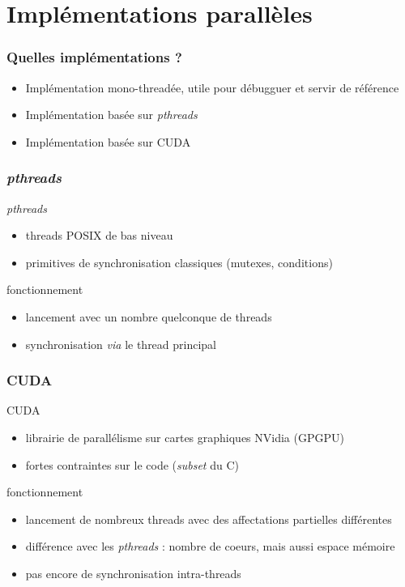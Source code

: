 \documentclass{beamer}
\newcommand{\cuda}{\textsc{CUDA}}
\begin{document}

\section{Implémentations parallèles}
\begin{frame}
\frametitle{Quelles implémentations ?}

\begin{itemize}
    \item Implémentation mono-threadée, utile pour débugguer et servir de référence
    \pause
    \item Implémentation basée sur \emph{pthreads}
    \pause
    \item Implémentation basée sur \cuda
\end{itemize}
\end{frame}

\begin{frame}
\frametitle{\emph{pthreads}}

\begin{block}{\emph{pthreads}}
\begin{itemize}
    \item threads \textsc{POSIX} de bas niveau
    \item primitives de synchronisation classiques (mutexes, conditions)
\end{itemize}
\end{block}
\pause

\begin{block}{fonctionnement}
\begin{itemize}
    \item lancement avec un nombre quelconque de threads
    \item synchronisation \emph{via} le thread principal
\end{itemize}
\end{block}
\end{frame}



\begin{frame}
\frametitle{\cuda}

\begin{block}{\cuda}
\begin{itemize}
    \item librairie de parallélisme sur cartes graphiques NVidia (GPGPU)
    \item fortes contraintes sur le code (\emph{subset} du C)
\end{itemize}
\end{block}
\pause
\begin{block}{fonctionnement}
\begin{itemize}
    \item lancement de nombreux threads avec des affectations partielles différentes
    \item différence avec les \emph{pthreads} : nombre de coeurs, mais aussi espace mémoire
    \item pas encore de synchronisation intra-threads
\end{itemize}
\end{block}
\end{frame}
\end{document}
